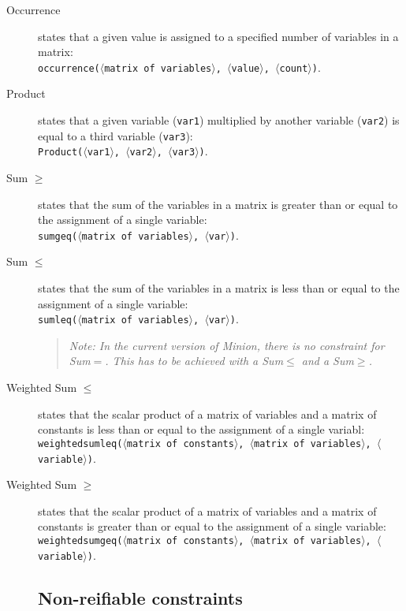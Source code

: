 \documentclass{article}
\begin{document}
\begin{small}
\begin{description}
\item[Occurrence] states that a given value is assigned to a specified
number of variables in a matrix:\\ \texttt{occurrence($\langle$matrix
of variables$\rangle$, $\langle$value$\rangle$,
$\langle$count$\rangle$)}.

\item[Product] states that a given variable (\texttt{var1}) multiplied
by another variable (\texttt{var2}) is equal to a third variable
(\texttt{var3}):\\ \texttt{Product($\langle$var1$\rangle$,
$\langle$var2$\rangle$, $\langle$var3$\rangle$)}.

\item[Sum $\mathbf{\geq}$] states that the sum of the variables in a
matrix is greater than or equal to the assignment of a single
variable:\\ \texttt{sumgeq($\langle$matrix of variables$\rangle$,
$\langle$var$\rangle$)}.

\item[Sum $\mathbf{\leq}$] states that the sum of the variables in a
matrix is less than or equal to the assignment of a single variable:\\
\texttt{sumleq($\langle$matrix of variables$\rangle$,
$\langle$var$\rangle$)}.

\begin{quote}
{\em Note: In the current version of {\sc Minion}, there is no 
constraint for Sum$=$.  This has to be achieved with a 
Sum$\mathbf{\leq}$ and a 
Sum$\mathbf{\geq}$.}
\end{quote}

\item[Weighted Sum $\mathbf{\leq}$] states that the scalar product of
a matrix of variables and a matrix of constants is less than or equal
to the assignment of a single variabl:\\
\texttt{weightedsumleq($\langle$matrix of constants$\rangle$,
$\langle$matrix of variables$\rangle$, $\langle$variable$\rangle$)}.

\item[Weighted Sum $\mathbf{\geq}$] states that the scalar product of
a matrix of variables and a matrix of constants is greater than or
equal to the assignment of a single variable:\\
\texttt{weightedsumgeq($\langle$matrix of constants$\rangle$,
$\langle$matrix of variables$\rangle$, $\langle$variable$\rangle$)}.


\subsection{Non-reifiable constraints}


\end{description}
\end{small}
\end{document}
